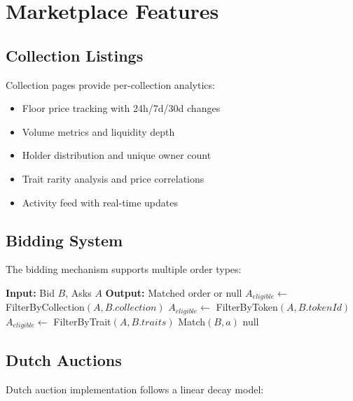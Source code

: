 \section{Marketplace Features}


\subsection{Collection Listings}

Collection pages provide per-collection analytics:

\begin{itemize}
\item Floor price tracking with 24h/7d/30d changes
\item Volume metrics and liquidity depth
\item Holder distribution and unique owner count
\item Trait rarity analysis and price correlations
\item Activity feed with real-time updates
\end{itemize}

\subsection{Bidding System}

The bidding mechanism supports multiple order types:

\begin{algorithm}
\caption{Bid Matching Algorithm}
\begin{algorithmic}
\STATE \textbf{Input:} Bid $B$, Asks $A$
\STATE \textbf{Output:} Matched order or null
\STATE
{}
    \STATE $A_{eligible} \leftarrow$ FilterByCollection$(A, B.collection)$
    \STATE $A_{eligible} \leftarrow$ FilterByToken$(A, B.tokenId)$
    \STATE $A_{eligible} \leftarrow$ FilterByTrait$(A, B.traits)$
\ENDIF
\STATE
{}
        \RETURN Match$(B, a)$
    \ENDIF
\ENDFOR
\RETURN null
\end{algorithmic}
\end{algorithm}

\subsection{Dutch Auctions}

Dutch auction implementation follows a linear decay model:

